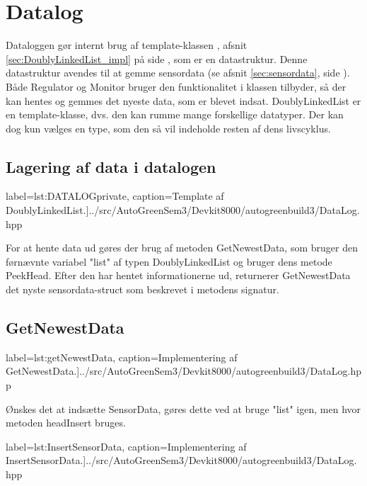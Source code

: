 \section{Datalog}

Dataloggen gør internt brug af template-klassen , afsnit \ref{sec:DoublyLinkedList_impl} på side \pageref{sec:DoublyLinkedList_impl}, som er en datastruktur. Denne datastruktur avendes til at gemme sensordata (se afsnit \ref{sec:sensordata}, side \pageref{sec:sensordata}). Både Regulator og Monitor bruger den funktionalitet i klassen tilbyder, så der kan hentes og gemmes det nyeste data, som er blevet indsat.
DoublyLinkedList er en template-klasse, dvs. den kan rumme mange forskellige datatyper. Der kan dog kun vælges en type, som den så vil indeholde resten af dens livscyklus.

\subsection{Lagering af data i datalogen}

 label=lst:DATALOGprivate, caption=Template af DoublyLinkedList.]{../src/AutoGreenSem3/Devkit8000/autogreenbuild3/DataLog.hpp}

For at hente data ud gøres der brug af metoden GetNewestData, som bruger den førnævnte variabel "list" af typen DoublyLinkedList og bruger dens metode PeekHead. Efter den har hentet informationerne ud, returnerer GetNewestData det nyste sensordata-struct som beskrevet i metodens signatur.

\clearpage

\subsection{GetNewestData}

 label=lst:getNewestData, caption=Implementering af GetNewestData.]{../src/AutoGreenSem3/Devkit8000/autogreenbuild3/DataLog.hpp}

Ønskes det at indsætte SensorData, gøres dette ved at bruge "list" igen, men hvor metoden headInsert bruges.

 label=lst:InsertSensorData, caption=Implementering af InsertSensorData.]{../src/AutoGreenSem3/Devkit8000/autogreenbuild3/DataLog.hpp}
